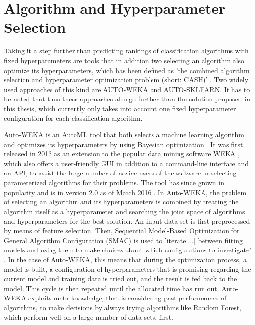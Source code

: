 \section{Algorithm and Hyperparameter Selection}
Taking it a step further than predicting rankings of classification algorithms with fixed hyperparameters are tools that in addition two selecting an algorithm also optimize its hyperparameters, which has been defined as 'the combined algorithm selection and hyperparameter optimization problem (short: CASH)' \cite{thornton2013auto}. Two widely used approaches of this kind are AUTO-WEKA and AUTO-SKLEARN. It has to be noted that thus these approaches also go further than the solution proposed in this thesis, which currently only takes into account one fixed hyperparameter configuration for each classification algorithm. 

Auto-WEKA is an AutoML tool that both selects a machine learning algorithm and optimizes its hyperparameters by using Bayesian optimization \cite{thornton2013auto}. It was first released in 2013 as an extension to the popular data mining software WEKA \cite{hall2009weka}, which also offers a user-friendly GUI in addition to a command-line interface and an API, to assist the large number of novice users of the software in selecting parameterized algorithms for their problems. The tool has since grown in popularity and is in version 2.0 as of March 2016 \cite{kotthoff2016auto}. In Auto-WEKA, the problem of selecting an algorithm and its hyperparameters is combined by treating the algorithm itself as a hyperparameter and searching the joint space of algorithms and hyperparameters for the best solution. An input data set is first preprocessed by means of feature selection. Then, Sequential Model-Based Optimization for General Algorithm Configuration (SMAC) is used to 'iterate[...] between fitting models and using them to make choices about which configurations to investigate' \cite{hutter2011sequential}. In the case of Auto-WEKA, this means that during the optimization process, a model is built, a configuration of hyperparameters that is promising regarding the current model and training data is tried out, and the result is fed back to the model. This cycle is then repeated until the allocated time has run out. Auto-WEKA exploits meta-knowledge, that is considering past performances of algorithms, to make decisions by always trying algorithms like Random Forest, which perform well on a large number of data sets, first. \\

